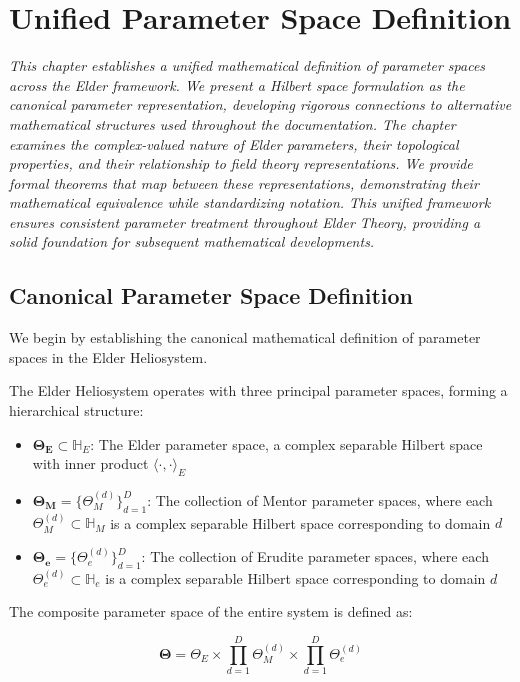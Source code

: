 \chapter{Unified Parameter Space Definition}

\textit{This chapter establishes a unified mathematical definition of parameter spaces across the Elder framework. We present a Hilbert space formulation as the canonical parameter representation, developing rigorous connections to alternative mathematical structures used throughout the documentation. The chapter examines the complex-valued nature of Elder parameters, their topological properties, and their relationship to field theory representations. We provide formal theorems that map between these representations, demonstrating their mathematical equivalence while standardizing notation. This unified framework ensures consistent parameter treatment throughout Elder Theory, providing a solid foundation for subsequent mathematical developments.}

\section{Canonical Parameter Space Definition}

We begin by establishing the canonical mathematical definition of parameter spaces in the Elder Heliosystem.

\begin{definition}
The Elder Heliosystem operates with three principal parameter spaces, forming a hierarchical structure:

\begin{itemize}
    \item $\boldsymbol{\Theta_E} \subset \mathbb{H}_E$: The Elder parameter space, a complex separable Hilbert space with inner product $\langle \cdot, \cdot \rangle_E$
    
    \item $\boldsymbol{\Theta_M} = \{\Theta_M^{(d)}\}_{d=1}^D$: The collection of Mentor parameter spaces, where each $\Theta_M^{(d)} \subset \mathbb{H}_M$ is a complex separable Hilbert space corresponding to domain $d$
    
    \item $\boldsymbol{\Theta_e} = \{\Theta_e^{(d)}\}_{d=1}^D$: The collection of Erudite parameter spaces, where each $\Theta_e^{(d)} \subset \mathbb{H}_e$ is a complex separable Hilbert space corresponding to domain $d$
\end{itemize}

The composite parameter space of the entire system is defined as:

\begin{equation}
\boldsymbol{\Theta} = \Theta_E \times \prod_{d=1}^D \Theta_M^{(d)} \times \prod_{d=1}^D \Theta_e^{(d)}
\end{equation}
\end{definition}

